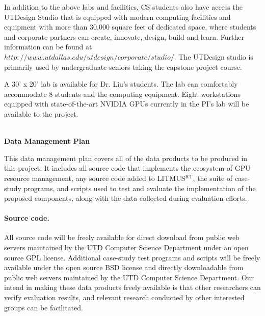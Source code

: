 \documentclass[10pt,letterpaper]{article}
\begin{document}
In addition to the above labs and facilities, CS students also have access the UTDesign Studio that is equipped with modern computing facilities and equipment with more than 30,000 square feet of dedicated space, where students and corporate partners can create, innovate, design, build and learn. Further information can be found at $http://www.utdallas.edu/utdesign/corporate/studio/$. The UTDesign studio is primarily used by undergraduate seniors taking the capstone project course.

A 30' x 20' lab is available for Dr. Liu's students. The lab can comfortably accommodate 8 students and the computing equipment. Eight workstations equipped with state-of-the-art NVIDIA GPUs currently in the PI's lab will be available to the project.


\newpage
{}

\begin{center}
\Large{\textbf{\\Data Management Plan}}
\end{center}

This data management plan covers all of the data products to be produced in this project. It includes all source code that implements the ecosystem of GPU resource management, any source code added to LITMUS$^{\textrm{RT}}$,  the suite of case-study programs, and scripts used to test and evaluate the implementation of the proposed components, along with the data collected during evaluation efforts. 

\paragraph{Source code.} All source code will be freely available for direct download from public web servers maintained by the UTD Computer Science Department under an open source GPL license.  Additional case-study test programs and scripts will be freely available under the open source BSD license and directly downloadable from public web servers maintained by the UTD Computer Science Department. Our intend in making these data products freely available is that other researchers can verify evaluation results, and relevant research conducted by other interested groups can be facilitated.
\end{document}
